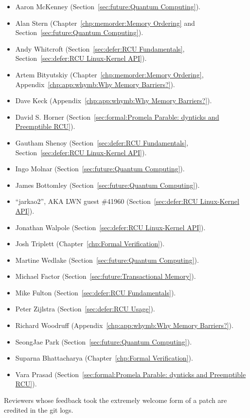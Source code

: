 \begin{itemize}
\item	Aaron McKenney (Section~\ref{sec:future:Quantum Computing}).
\item	Alan Stern (Chapter~\ref{chp:memorder:Memory Ordering}
	and Section~\ref{sec:future:Quantum Computing}).
\item	Andy Whitcroft (Section~\ref{sec:defer:RCU Fundamentals},
	Section~\ref{sec:defer:RCU Linux-Kernel API}).
\item	Artem Bityutskiy (Chapter~\ref{chp:memorder:Memory Ordering},
	Appendix~\ref{chp:app:whymb:Why Memory Barriers?}).
\item	Dave Keck (Appendix~\ref{chp:app:whymb:Why Memory Barriers?}).
\item	David S. Horner
	(Section~\ref{sec:formal:Promela Parable: dynticks and Preemptible RCU}).
\item	Gautham Shenoy (Section~\ref{sec:defer:RCU Fundamentals},
	Section~\ref{sec:defer:RCU Linux-Kernel API}).
\item	Ingo Molnar (Section~\ref{sec:future:Quantum Computing}).
\item	James Bottomley (Section~\ref{sec:future:Quantum Computing}).
\item	``jarkao2'', AKA LWN guest \#41960 (Section~\ref{sec:defer:RCU Linux-Kernel API}).
\item	Jonathan Walpole (Section~\ref{sec:defer:RCU Linux-Kernel API}).
\item	Josh Triplett (Chapter~\ref{chp:Formal Verification}).
\item	Martine Wedlake (Section~\ref{sec:future:Quantum Computing}).
\item	Michael Factor (Section~\ref{sec:future:Transactional Memory}).
\item	Mike Fulton (Section~\ref{sec:defer:RCU Fundamentals}).
\item	Peter Zijlstra
	(Section~\ref{sec:defer:RCU Usage}). %
\item	Richard Woodruff (Appendix~\ref{chp:app:whymb:Why Memory Barriers?}).
\item	SeongJae Park (Section~\ref{sec:future:Quantum Computing}).
\item	Suparna Bhattacharya (Chapter~\ref{chp:Formal Verification}).
\item	Vara Prasad
	(Section~\ref{sec:formal:Promela Parable: dynticks and Preemptible RCU}).
\end{itemize}

Reviewers whose feedback took the extremely welcome form of a patch
are credited in the git logs.

